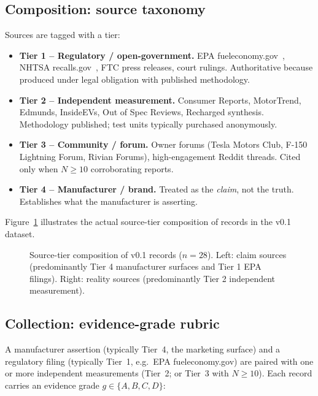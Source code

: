 \documentclass{article}
\begin{document}
\subsection{Composition: source taxonomy}\label{sec:sources}

Sources are tagged with a tier:

\begin{itemize}
  \item \textbf{Tier 1 -- Regulatory / open-government.} EPA fueleconomy.gov~\cite{epa_fueleconomy}, NHTSA recalls.gov~\cite{nhtsa_recalls}, FTC press releases, court rulings. Authoritative because produced under legal obligation with published methodology.
  \item \textbf{Tier 2 -- Independent measurement.} Consumer Reports, MotorTrend, Edmunds, InsideEVs, Out of Spec Reviews, Recharged synthesis. Methodology published; test units typically purchased anonymously.
  \item \textbf{Tier 3 -- Community / forum.} Owner forums (Tesla Motors Club, F-150 Lightning Forum, Rivian Forums), high-engagement Reddit threads. Cited only when $N \geq 10$ corroborating reports.
  \item \textbf{Tier 4 -- Manufacturer / brand.} Treated as the \emph{claim}, not the truth. Establishes what the manufacturer is asserting.
\end{itemize}

Figure~\ref{fig:source-tier} illustrates the actual source-tier composition of records in the v0.1 dataset.

\begin{figure}[!htbp]
\centering

\caption{Source-tier composition of v0.1 records ($n=28$). Left: claim sources (predominantly Tier 4 manufacturer surfaces and Tier 1 EPA filings). Right: reality sources (predominantly Tier 2 independent measurement).}
\label{fig:source-tier}
\end{figure}

\subsection{Collection: evidence-grade rubric}\label{sec:rubric}

A manufacturer assertion (typically Tier~4, the marketing surface) and a regulatory filing (typically Tier~1, e.g.\ EPA fueleconomy.gov) are paired with one or more independent measurements (Tier~2; or Tier~3 with $N \geq 10$). Each record carries an evidence grade $g \in \{A, B, C, D\}$:
\end{document}
